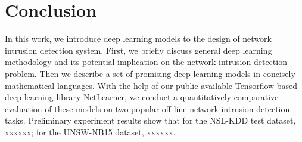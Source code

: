 \section{Conclusion}
In this work, we introduce deep learning models to the design of network intrusion detection system.
First, we briefly discuss general deep learning methodology and
its potential implication on the network intrusion detection problem.
Then we describe a set of promising deep learning models in concisely mathematical languages.
With the help of our public available Tensorflow-based deep learning library NetLearner,
we conduct a quantitatively comparative evaluation of these models on two popular
off-line network intrusion detection tasks. 
Preliminary experiment results show that for the NSL-KDD test dataset, xxxxxx;
for the UNSW-NB15 dataset, xxxxxx.
